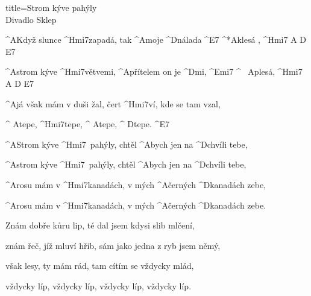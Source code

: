 \begin{song}{title=\predtitle\centering Strom kýve pahýly \\\large Divadlo Sklep \vspace*{-0.3cm}}  %
\begin{centerjustified}

\sloka
	^{A\z}Když slunce ^{Hmi7\z}zapadá, tak ^{A\z}moje ^{\z D}nálada ^{E7} ^*{\z A}klesá , ^{Hmi7\,\,A\,\,D\,\,E7}

	^{A\z}strom kýve ^{Hmi7\z}větvemi, ^{A}přítelem on je ^{D}mi, ^{Emi7} ^{\,\,\,\,\,A}plesá, ^{Hmi7\,\,A\,\,D\,\,E7}

	^{A}já však mám v duši žal, čert ^{Hmi7}ví, kde se tam vzal,

	^{\,\,A}tepe, ^{\z Hmi7}tepe, ^{\,\,A}tepe, ^{\,\,D}tepe. ^{E7}

	^{A\z}Strom kýve ^{Hmi7\,\,\,}pahýly, chtěl ^{A\z}bych jen na ^{\z D}chvíli tebe,

	^{A\z}strom kýve ^{Hmi7\,\,\,}pahýly, chtěl ^{A\z}bych jen na ^{\z D}chvíli tebe,

	^{A\z}rosu mám v ^{Hmi7\z}kanadách, v mých ^{A\z}černých ^{\z D}kanadách zebe,

	^{A\z}rosu mám v ^{Hmi7\z}kanadách, v mých ^{A\z}černých ^{\z D}kanadách zebe.


\sloka
	Znám dobře kůru lip, té dal jsem kdysi slib mlčení,

	znám řeč, jíž mluví hřib, sám jako jedna z ryb jsem němý,

	však lesy, ty mám rád, tam cítím se vždycky mlád,

	vždycky líp, vždycky líp, vždycky líp, vždycky líp.




\end{centerjustified}
\setcounter{Slokočet}{0}
\end{song}
